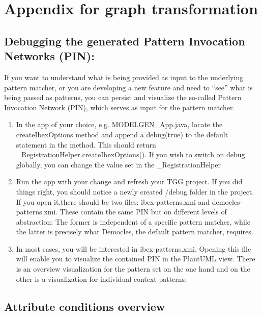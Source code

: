 \section{Appendix for graph transformation}

\subsection{Debugging the generated Pattern Invocation Networks (PIN):}

If you want to understand what is being provided as input to the underlying pattern matcher, or you are developing a new feature and need to “see” what is being passed as patterns, you can persist and visualize the so-called Pattern Invocation Network (PIN), which serves as input for the pattern matcher.

\begin{enumerate}

    \item In the app of your choice, e.g. MODELGEN\_App.java, locate the createIbexOptions method and append a debug(true) to the default statement in the method. This should return \_RegistrationHelper.createIbexOptions(). If you wish to switch on debug globally, you can change the value set in the \_RegistrationHelper
    
    \item Run the app with your change and refresh your TGG project. If you did things right, you should notice a newly created /debug folder in the project. If you open it,there should be two files: ibex-patterns.xmi and democles-patterns.xmi. These contain the same PIN but on different levels of abstraction: The former is independent of a specific pattern matcher, while the latter is precisely what Democles, the default pattern matcher, requires.
    
    \item In most cases, you will be interested in ibex-patterns.xmi. Opening this file will enable you to visualize the contained PIN in the PlantUML view. There is an overview visualization for the pattern set on the one hand and on the other is a visualization for individual context patterns.

\end{enumerate}

\clearpage

\subsection{Attribute conditions overview}

